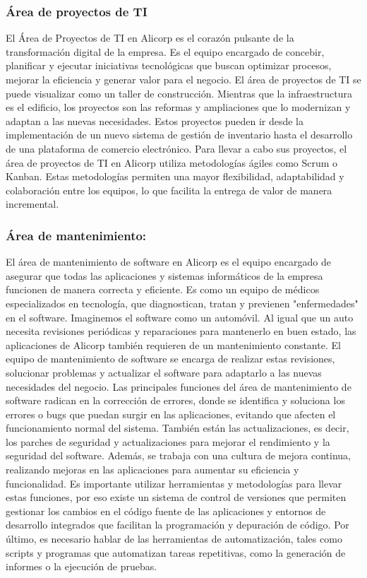     \subsubsection{Área de proyectos de TI}
    El Área de Proyectos de TI en Alicorp es el corazón pulsante de la transformación digital de la empresa. Es el equipo encargado de concebir, planificar y ejecutar iniciativas tecnológicas que buscan optimizar procesos, mejorar la eficiencia y generar valor para el negocio. 
    El área de proyectos de TI se puede visualizar como un taller de construcción. Mientras que la infraestructura es el edificio, los proyectos son las reformas y ampliaciones que lo modernizan y adaptan a las nuevas necesidades. Estos proyectos pueden ir desde la implementación de un nuevo sistema de gestión de inventario hasta el desarrollo de una plataforma de comercio electrónico. 
    Para llevar a cabo sus proyectos, el área de proyectos de TI en Alicorp utiliza metodologías ágiles como Scrum o Kanban. Estas metodologías permiten una mayor flexibilidad, adaptabilidad y colaboración entre los equipos, lo que facilita la entrega de valor de manera incremental. 
    \subsubsection{Área de mantenimiento: }
    El área de mantenimiento de software en Alicorp es el equipo encargado de asegurar que todas las aplicaciones y sistemas informáticos de la empresa funcionen de manera correcta y eficiente. Es como un equipo de médicos especializados en tecnología, que diagnostican, tratan y previenen "enfermedades" en el software. 
    Imaginemos el software como un automóvil. Al igual que un auto necesita revisiones periódicas y reparaciones para mantenerlo en buen estado, las aplicaciones de Alicorp también requieren de un mantenimiento constante. El equipo de mantenimiento de software se encarga de realizar estas revisiones, solucionar problemas y actualizar el software para adaptarlo a las nuevas necesidades del negocio. 
    Las principales funciones del área de mantenimiento de software radican en la corrección de errores, donde se identifica y soluciona los errores o bugs que puedan surgir en las aplicaciones, evitando que afecten el funcionamiento normal del sistema. También están las actualizaciones, es decir, los parches de seguridad y actualizaciones para mejorar el rendimiento y la seguridad del software. Además, se trabaja con una cultura de mejora continua, realizando mejoras en las aplicaciones para aumentar su eficiencia y funcionalidad. 
    Es importante utilizar herramientas y metodologías para llevar estas funciones, por eso existe un sistema de control de versiones que permiten gestionar los cambios en el código fuente de las aplicaciones y entornos de desarrollo integrados que facilitan la programación y depuración de código. Por último, es necesario hablar de las herramientas de automatización, tales como scripts y programas que automatizan tareas repetitivas, como la generación de informes o la ejecución de pruebas. 

